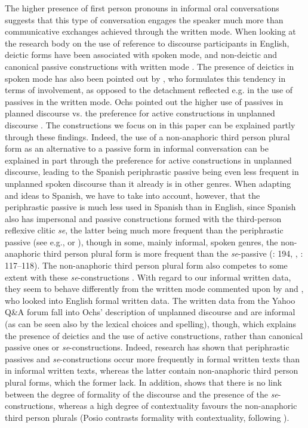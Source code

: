 \documentclass[output=paper]{langscibook}
\begin{document}
The higher presence of first person pronouns in informal oral conversations suggests that this type of conversation engages the speaker much more than communicative exchanges achieved through the written mode. When looking at the research body on the use of reference to discourse participants in English, deictic forms have been associated with spoken mode, and non-deictic and canonical passive constructions with written mode \citep{Biber1988}. The presence of deictics in spoken mode has also been pointed out by \citet{Chafe1982}, who formulates this tendency in terms of involvement, as opposed to the detachment reflected e.g. in the use of passives in the written mode. Ochs pointed out the higher use of passives in planned discourse vs. the preference for active constructions in unplanned discourse \citep[76]{Ochs1979}. The constructions we focus on in this paper can be explained partly through these findings. Indeed, the use of a non-anaphoric third person plural form as an alternative to a passive form in informal conversation can be explained in part through the preference for active constructions in unplanned discourse, leading to the Spanish periphrastic passive being even less frequent in unplanned spoken discourse than it already is in other genres. When adapting  and  ideas to Spanish, we have to take into account, however, that the periphrastic passive is much less used in Spanish than in English, since Spanish also has impersonal and passive constructions formed with the third-person reflexive clitic \textit{se}, the latter being much more frequent than the periphrastic passive (see e.g., \citealt{LaslopDíaz2010} or \citealt{Pierre2021}), though in some, mainly informal, spoken genres, the non-anaphoric third person plural form is more frequent than the \textit{se}-passive (\citealt{DeCock2014}: 194, \citealt{Posio2015Alcance}, \citealt{Pierre2021}: 117--118). The non-anaphoric third person plural form also competes to some extent with these \textit{se}-constructions \citep[86]{Siewierska2011}. With regard to our informal written data, they seem to behave differently from the written mode commented upon by \citet{Biber1988} and \citet{Chafe1982}, who looked into English formal written data. The written data from the Yahoo Q\&A forum fall into Ochs’ description of unplanned discourse and are informal (as can be seen also by the lexical choices and spelling), though, which explains the presence of deictics and the use of active constructions, rather than canonical passive ones or \textit{se}-constructions. Indeed, research has shown \citep{Pierre2021} that periphrastic passives and \textit{se}-constructions occur more frequently in formal written texts than in informal written texts, whereas the latter contain non-anaphoric third person plural forms, which the former lack. In addition, \citet[384]{Posio2015Alcance} shows that there is no link between the degree of formality of the discourse and the presence of the \textit{se}-con\-struc\-tions, whereas a high degree of contextuality favours the non-anaphoric third person plurals (Posio contrasts formality with contextuality, following \citealt{HeylighenDewaele2002}).
\end{document}
